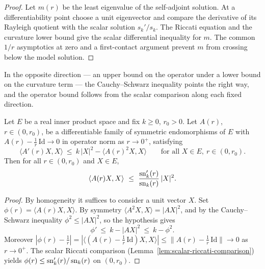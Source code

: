 \begin{proof}
\sketch

Let $m(r)$ be the least eigenvalue of the self-adjoint solution. At a differentiability point choose a unit eigenvector and compare the derivative of its Rayleigh quotient with the scalar solution $s_k'/s_k$. The Riccati equation and the curvature lower bound give the scalar differential inequality for $m$. The common $1/r$ asymptotics at zero and a first-contact argument prevent $m$ from crossing below the model solution.
\end{proof}

In the opposite direction — an upper bound on the operator under a
lower bound on the curvature term — the Cauchy--Schwarz inequality
points the right way, and the operator bound follows from the scalar
comparison along each fixed direction.

\begin{lemma}
\label{lem:operator-riccati-upper}





Let $E$ be a real inner product space and fix $k\ge0$, $r_0>0$. Let
$A(r)$, $r\in(0,r_0)$, be a differentiable family of symmetric
endomorphisms of $E$ with
$A(r)-\tfrac1r\,\mathrm{Id}\to0$ in operator norm as $r\to0^+$,
satisfying
$$\langle A'(r)X,X\rangle\ \le\ k\,|X|^2-\langle A(r)^2X,X\rangle
\qquad\text{for all }X\in E,\ r\in(0,r_0).$$
Then for all $r\in(0,r_0)$ and $X\in E$,
$$\langle A(r)X,X\rangle\ \le\
\frac{\operatorname{sn}_k'(r)}{\operatorname{sn}_k(r)}\,|X|^2 .$$
\end{lemma}

\begin{proof}
\sketch
{}

By homogeneity it suffices to consider a unit vector $X$. Set
$\phi(r)=\langle A(r)X,X\rangle$. By symmetry
$\langle A^2X,X\rangle=|AX|^2$, and by the Cauchy--Schwarz
inequality $\phi^2\le|AX|^2$, so the hypothesis gives
$$\phi'\ \le\ k-|AX|^2\ \le\ k-\phi^2 .$$
Moreover
$|\phi(r)-\tfrac1r|=|\langle(A(r)-\tfrac1r\,\mathrm{Id})X,X\rangle|
\le\|A(r)-\tfrac1r\,\mathrm{Id}\|\to0$ as $r\to0^+$. The scalar
Riccati comparison (Lemma~\ref{lem:scalar-riccati-comparison})
yields $\phi(r)\le\operatorname{sn}_k'(r)/\operatorname{sn}_k(r)$ on $(0,r_0)$.
\end{proof}

